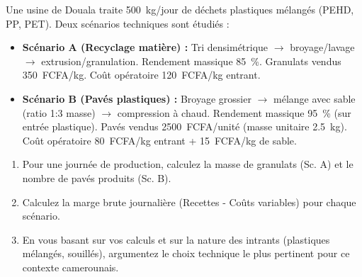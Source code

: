 \documentclass[11pt]{article}
\begin{document}
\begin{exercice}
Une usine de Douala traite \SI{500}{kg/jour} de déchets plastiques mélangés (PEHD, PP, PET). Deux scénarios techniques sont étudiés :
\begin{itemize}
    \item \textbf{Scénario A (Recyclage matière) :} Tri densimétrique $\rightarrow$ broyage/lavage $\rightarrow$ extrusion/granulation. Rendement massique \SI{85}{\%}. Granulats vendus \SI{350}{FCFA/kg}. Coût opératoire \SI{120}{FCFA/kg} entrant.
    \item \textbf{Scénario B (Pavés plastiques) :} Broyage grossier $\rightarrow$ mélange avec sable (ratio 1:3 masse) $\rightarrow$ compression à chaud. Rendement massique \SI{95}{\%} (sur entrée plastique). Pavés vendus \SI{2500}{FCFA/unité} (masse unitaire \SI{2.5}{kg}). Coût opératoire \SI{80}{FCFA/kg} entrant + \SI{15}{FCFA/kg} de sable.
\end{itemize}
\begin{enumerate}
    \item Pour une journée de production, calculez la masse de granulats (Sc. A) et le nombre de pavés produits (Sc. B).
    \item Calculez la marge brute journalière (Recettes - Coûts variables) pour chaque scénario.
    \item En vous basant sur vos calculs et sur la nature des intrants (plastiques mélangés, souillés), argumentez le choix technique le plus pertinent pour ce contexte camerounais.
\end{enumerate}
\end{exercice}
\end{document}
